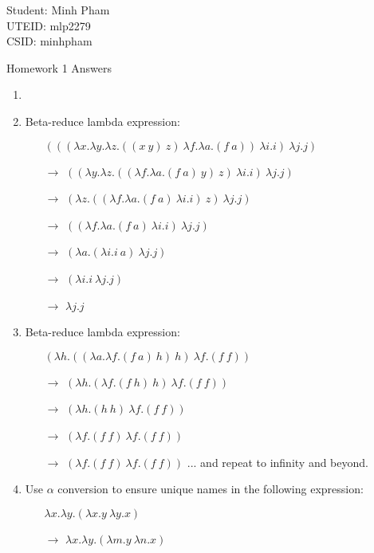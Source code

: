 \documentclass[12pt]{letter}
\begin{document}
	Student: Minh Pham \\
	UTEID: mlp2279 \\
	CSID: minhpham

	\begin{center}
		\begin{large} Homework 1 Answers \end{large}
	\end{center}

	\begin{enumerate}

		\item
		
		\item Beta-reduce lambda expression:
		\begin{itemize}
			\item[] $(((\lambda x.\lambda y.\lambda z.((x~y)~z)~\lambda f.\lambda a.(f~a))~\lambda i.i)~\lambda j.j)$
			\item[$\rightarrow$]
			$((\lambda y.\lambda z.((\lambda f.\lambda a.(f~a)~y)~z)~\lambda i.i)~\lambda j.j)$
			\item[$\rightarrow$]
			$(\lambda z.((\lambda f.\lambda a.(f~a)~\lambda i.i)~z)~\lambda j.j)$
			\item[$\rightarrow$]
			$((\lambda f.\lambda a.(f~a)~\lambda i.i)~\lambda j.j)$
			\item[$\rightarrow$]
			$(\lambda a.(\lambda i.i~a)~\lambda j.j)$
			\item[$\rightarrow$]
			$(\lambda i.i~\lambda j.j)$
			\item[$\rightarrow$]
			$\lambda j.j$
		\end{itemize}
		
		\item Beta-reduce lambda expression:
		\begin{itemize}
			\item[]
			$(\lambda h.((\lambda a.\lambda f.(f~a)~h)~h)~\lambda f.(f~f))$
			\item[$\rightarrow$]
			$(\lambda h.(\lambda f.(f~h)~h)~\lambda f.(f~f))$
			\item[$\rightarrow$]
			$(\lambda h.(h~h)~\lambda f.(f~f))$
			\item[$\rightarrow$]
			$(\lambda f.(f~f)~\lambda f.(f~f))$
			\item[$\rightarrow$]
			$(\lambda f.(f~f)~\lambda f.(f~f))$
			... and repeat to infinity and beyond.
		\end{itemize}
		
		\item Use $\alpha$ conversion to ensure unique names in the following expression:
		\begin{itemize}
			\item[]
			$\lambda x.\lambda y.(\lambda x.y~\lambda y.x)$
			\item[$\rightarrow$]
			$\lambda x.\lambda y.(\lambda m.y~\lambda n.x)$
		\end{itemize}
		

\end{enumerate}
\end{document}
